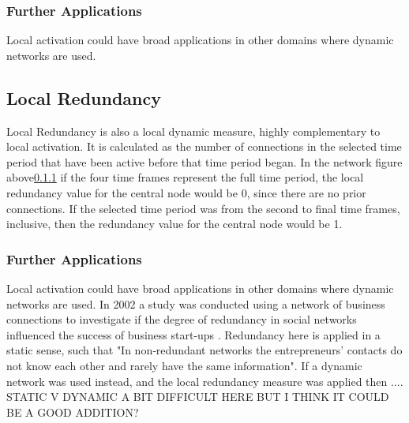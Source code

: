 \subsubsection{Further Applications}
Local activation could have broad applications in other domains where dynamic networks are used. 
\newline\newline



\subsection{Local Redundancy}

Local Redundancy is also a local dynamic measure, highly complementary to local activation. It is calculated as the number of connections in the selected time period that have been active before that time period began. In the network figure above\ref{} if the four time frames represent the full time period, the local redundancy value for the central node would be 0, since there are no prior connections. If the selected time period was from the second to final time frames, inclusive, then the redundancy value for the central node would be 1.

\subsubsection{Further Applications}
Local activation could have broad applications in other domains where dynamic networks are used. 
\newline\newline
In 2002 a study was conducted using a network of business connections to investigate if the degree of redundancy in social networks influenced the success of business start-ups \cite{socRed}. Redundancy here is applied in a static sense, such that "In non‐redundant networks the entrepreneurs’ contacts do not know each other and rarely have the same information". If a dynamic network was used instead, and the local redundancy measure was applied then .... STATIC V DYNAMIC A BIT DIFFICULT HERE BUT I THINK IT COULD BE A GOOD ADDITION?

